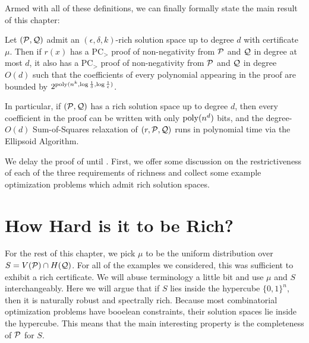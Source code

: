 Armed with all of these definitions, we can finally formally state the main result of this chapter:
\begin{theorem}\label{thm:bit_complexity-main}
Let $(\mathcal P, \mathcal Q)$ admit an $(\epsilon,\delta,k)$-rich solution space up to degree $d$ with certificate $\mu$. Then if $r(x)$ has a PC$_>$ proof of non-negativity from $\mathcal P$ and $\mathcal Q$ in degree at most $d$, it also has a PC$_>$ proof of non-negativity from $\mathcal P$ and $\mathcal Q$ in degree $O(d)$ such that the coefficients of every polynomial appearing in the proof are bounded by $2^{\operatorname{poly}(n^k, \log \frac{1}{\delta}, \log \frac{1}{\epsilon})}$. 

In particular, if $(\mathcal P,\mathcal Q)$ has a rich solution space up to degree $d$, then every coefficient in the proof can be written with only $\operatorname{poly}(n^d)$ bits, and the degree-$O(d)$ Sum-of-Squares relaxation of $(r, \mathcal P, \mathcal Q)$ runs in polynomial time via the Ellipsoid Algorithm.
\end{theorem}

We delay the proof of  until . First, we offer some discussion on the restrictiveness of each of the three requirements of richness and collect some example optimization problems which admit rich solution spaces.

\section{How Hard is it to be Rich?}
For the rest of this chapter, we pick $\mu$ to be the uniform distribution over $S = V(\mathcal P) \cap H(\mathcal Q)$. For all of the examples we considered, this was sufficient to exhibit a rich certificate. We will abuse terminology a little bit and use $\mu$ and $S$ interchangeably. Here we will argue that if $S$ lies inside the hypercube $\{0,1\}^n$, then it is naturally robust and spectrally rich. Because most combinatorial optimization problems have booelean constraints, their solution spaces lie inside the hypercube. This means that the main interesting property is the completeness of $\mathcal P$ for $S$.
